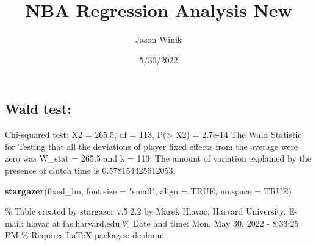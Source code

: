 \documentclass[
  landscape]{article}
\title{NBA Regression Analysis New}
\author{Jason Winik}
\date{5/30/2022}
\newenvironment{Shaded}{\begin{snugshade}}{\end{snugshade}}
\newcommand{\DataTypeTok}[1]{\textcolor[rgb]{0.13,0.29,0.53}{#1}}
\newcommand{\KeywordTok}[1]{\textcolor[rgb]{0.13,0.29,0.53}{\textbf{#1}}}
\newcommand{\NormalTok}[1]{#1}
\newcommand{\OtherTok}[1]{\textcolor[rgb]{0.56,0.35,0.01}{#1}}
\newcommand{\StringTok}[1]{\textcolor[rgb]{0.31,0.60,0.02}{#1}}
\begin{document}
\maketitle

\hypertarget{wald-test}{%
\subsection{Wald test:}\label{wald-test}}

Chi-squared test: X2 = 265.5, df = 113, P(\textgreater{} X2) = 2.7e-14
The Wald Statistic for Testing that all the deviations of player fixed
effects from the average were zero was W\_stat = 265.5 and k = 113. The
amount of variation explained by the presence of clutch time is
0.578154425612053.

\begin{Shaded}
\begin{Highlighting}[]
\KeywordTok{stargazer}\NormalTok{(fixed_lm,}
          \DataTypeTok{font.size =} \StringTok{"small"}\NormalTok{, }
          \DataTypeTok{align =} \OtherTok{TRUE}\NormalTok{, }
          \DataTypeTok{no.space =} \OtherTok{TRUE}\NormalTok{)}
\end{Highlighting}
\end{Shaded}

\% Table created by stargazer v.5.2.2 by Marek Hlavac, Harvard
University. E-mail: hlavac at fas.harvard.edu \% Date and time: Mon, May
30, 2022 - 8:33:25 PM \% Requires LaTeX packages: dcolumn
\end{document}
